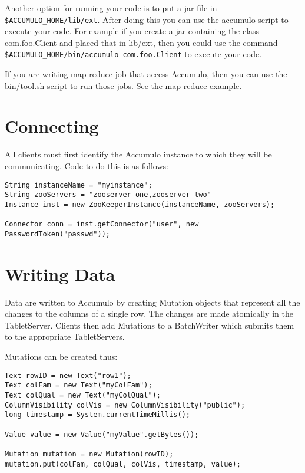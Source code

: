 Another option for running your code is to put a jar file in
\texttt{\$ACCUMULO\_HOME/lib/ext}. After doing this you can use the accumulo
script to execute your code. For example if you create a jar containing the
class com.foo.Client and placed that in lib/ext, then you could use the command
\texttt{\$ACCUMULO\_HOME/bin/accumulo com.foo.Client} to execute your code.

If you are writing map reduce job that access Accumulo, then you can use the
bin/tool.sh script to run those jobs. See the map reduce example.

\section{Connecting}

All clients must first identify the Accumulo instance to which they will be
communicating. Code to do this is as follows:

\small
\begin{verbatim}
String instanceName = "myinstance";
String zooServers = "zooserver-one,zooserver-two"
Instance inst = new ZooKeeperInstance(instanceName, zooServers);

Connector conn = inst.getConnector("user", new PasswordToken("passwd"));
\end{verbatim}
\normalsize

\section{Writing Data}

Data are written to Accumulo by creating Mutation objects that represent all the
changes to the columns of a single row. The changes are made atomically in the
TabletServer. Clients then add Mutations to a BatchWriter which submits them to
the appropriate TabletServers.

Mutations can be created thus:

\small
\begin{verbatim}
Text rowID = new Text("row1");
Text colFam = new Text("myColFam");
Text colQual = new Text("myColQual");
ColumnVisibility colVis = new ColumnVisibility("public");
long timestamp = System.currentTimeMillis();

Value value = new Value("myValue".getBytes());

Mutation mutation = new Mutation(rowID);
mutation.put(colFam, colQual, colVis, timestamp, value);
\end{verbatim}
\normalsize

